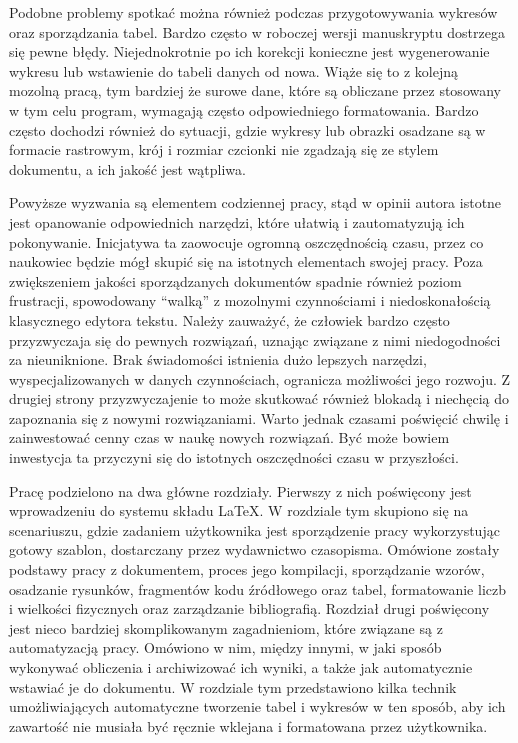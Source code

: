 Podobne problemy spotkać można również podczas przygotowywania wykresów oraz sporządzania tabel. Bardzo często w roboczej wersji manuskryptu dostrzega się pewne błędy. Niejednokrotnie po ich korekcji konieczne jest wygenerowanie wykresu lub wstawienie do tabeli danych od nowa. Wiąże się to z kolejną mozolną pracą, tym bardziej że surowe dane, które są obliczane przez stosowany w tym celu program, wymagają często odpowiedniego formatowania. Bardzo często dochodzi również do sytuacji, gdzie wykresy lub obrazki osadzane są w formacie rastrowym, krój i rozmiar czcionki nie zgadzają się ze stylem dokumentu, a ich jakość jest wątpliwa.

Powyższe wyzwania są elementem codziennej pracy, stąd w opinii autora istotne jest opanowanie odpowiednich narzędzi, które ułatwią i zautomatyzują ich pokonywanie. Inicjatywa ta zaowocuje ogromną oszczędnością czasu, przez co naukowiec będzie mógł skupić się na istotnych elementach swojej pracy. Poza zwiększeniem jakości sporządzanych dokumentów spadnie również poziom frustracji, spowodowany \enquote{walką} z mozolnymi czynnościami i niedoskonałością klasycznego edytora tekstu. Należy zauważyć, że człowiek bardzo często przyzwyczaja się do pewnych rozwiązań, uznając związane z nimi niedogodności za nieuniknione. Brak świadomości istnienia dużo lepszych narzędzi, wyspecjalizowanych w danych czynnościach, ogranicza możliwości jego rozwoju. Z drugiej strony przyzwyczajenie to może skutkować również blokadą i niechęcią do zapoznania się z nowymi rozwiązaniami. Warto jednak czasami poświęcić chwilę i zainwestować cenny czas w naukę nowych rozwiązań. Być może bowiem inwestycja ta przyczyni się do istotnych oszczędności czasu w przyszłości.

Pracę podzielono na dwa główne rozdziały. Pierwszy z nich poświęcony jest wprowadzeniu do systemu składu \LaTeX{}. W rozdziale tym skupiono się na scenariuszu, gdzie zadaniem użytkownika jest sporządzenie pracy wykorzystując gotowy szablon, dostarczany przez wydawnictwo czasopisma. Omówione zostały podstawy pracy z dokumentem, proces jego kompilacji, sporządzanie wzorów, osadzanie rysunków, fragmentów kodu źródłowego oraz tabel, formatowanie liczb i wielkości fizycznych oraz zarządzanie bibliografią. Rozdział drugi poświęcony jest nieco bardziej skomplikowanym zagadnieniom, które związane są z automatyzacją pracy. Omówiono w nim, między innymi, w jaki sposób wykonywać obliczenia i archiwizować ich wyniki, a także jak automatycznie wstawiać je do dokumentu. W rozdziale tym przedstawiono kilka technik umożliwiających automatyczne tworzenie tabel i wykresów w ten sposób, aby ich zawartość nie musiała być ręcznie wklejana i formatowana przez użytkownika.
